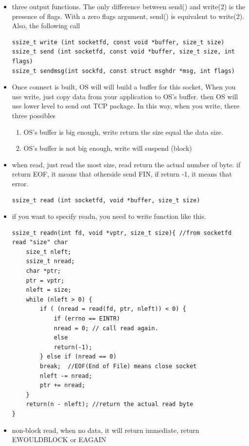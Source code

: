 \documentclass[a4paper,11pt,twoside]{book}
\begin{document}
\begin{itemize}
	
	
	\item three output functions. The  only difference between send() and write(2) is the
	presence of flags.  With a zero flags argument, send() is equivalent to  write(2).   Also,
	the following call
	
\begin{lstlisting}
ssize_t write (int socketfd, const void *buffer, size_t size)
ssize_t send (int socketfd, const void *buffer, size_t size, int flags)
ssize_t sendmsg(int sockfd, const struct msghdr *msg, int flags)	
\end{lstlisting}
	\item Once connect is built, OS will will build a buffer for this socket, When you use write, just copy data from your application to OS's buffer. then OS will use lower level to send out TCP package. In this way, when you write, there three possibles
	\begin{enumerate}
		\item OS's buffer is big enough, write return the size equal the data size.
		\item OS's buffer is not big enough, write will suspend (block)
	\end{enumerate}

	\item when read, just read the most size, read return the actual number of byte.  if return EOF, it means that otherside send FIN,  if return -1, it means that error.
\begin{lstlisting}
ssize_t read (int socketfd, void *buffer, size_t size)	
\end{lstlisting}	

 \item if you want to specify readn, you need to write function like this.
 
\begin{lstlisting}
ssize_t readn(int fd, void *vptr, size_t size){ //from socketfd read "size" char
	size_t nleft;
	ssize_t nread;
	char *ptr;
	ptr = vptr;
	nleft = size;
	while (nleft > 0) {
		if ( (nread = read(fd, ptr, nleft)) < 0) {
			if (errno == EINTR)
			nread = 0; // call read again.
			else
			return(-1);
		} else if (nread == 0)
		break;  //EOF(End of File) means close socket
		nleft -= nread;
		ptr += nread;
	}
	return(n - nleft); //return the actual read byte 
}
\end{lstlisting}

\item non-block read, when no data, it will return immediate, return  EWOULDBLOCK or EAGAIN


\end{itemize}
\end{document}
